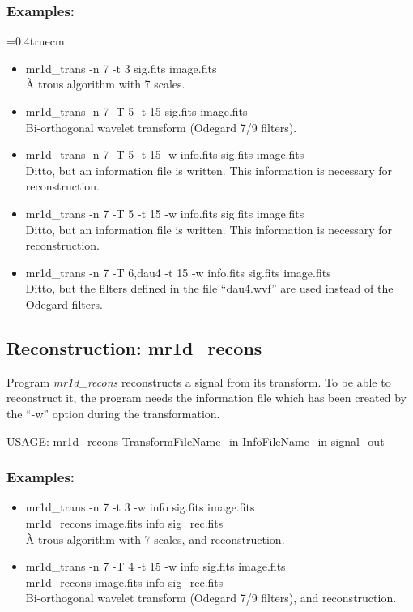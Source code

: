 \subsubsection*{Examples:}
\baselineskip=0.4truecm
\begin{itemize}
\baselineskip=0.4truecm
\itemsep=0.1truecm
\item mr1d\_trans -n 7 -t 3 sig.fits image.fits \\
\`A trous algorithm with 7 scales.
\item mr1d\_trans -n 7 -T 5 -t 15 sig.fits image.fits  \\
Bi-orthogonal wavelet transform (Odegard 7/9 filters).
\item mr1d\_trans -n 7 -T 5 -t 15 -w info.fits sig.fits image.fits  \\
Ditto, but an information file is written. This information 
is necessary for reconstruction.
\item mr1d\_trans -n 7 -T 5 -t 15 -w info.fits sig.fits image.fits  \\
Ditto, but an information file is written. This information 
is necessary for reconstruction.
\item mr1d\_trans -n 7 -T 6,dau4 -t 15 -w info.fits sig.fits image.fits  \\
Ditto, but the filters defined in the file ``dau4.wvf'' are used instead
of the Odegard filters.
\end{itemize}


\subsection{Reconstruction: mr1d\_recons}
Program {\em mr1d\_recons} reconstructs a signal from its transform.
To be able to reconstruct it, the program needs the information file
which has been created by the ``-w'' option during the transformation.
{\bf
\begin{center}
 USAGE: mr1d\_recons TransformFileName\_in InfoFileName\_in  signal\_out
\end{center}}
\subsubsection*{Examples:}
\begin{itemize}
\item mr1d\_trans -n 7 -t 3 -w info sig.fits image.fits \\
      mr1d\_recons image.fits info sig\_rec.fits \\
\`A trous algorithm with 7 scales, and reconstruction.
\item mr1d\_trans -n 7 -T 4 -t 15 -w info sig.fits image.fits  \\
mr1d\_recons image.fits info sig\_rec.fits \\
Bi-orthogonal wavelet transform (Odegard 7/9 filters), and reconstruction.
\end{itemize}

